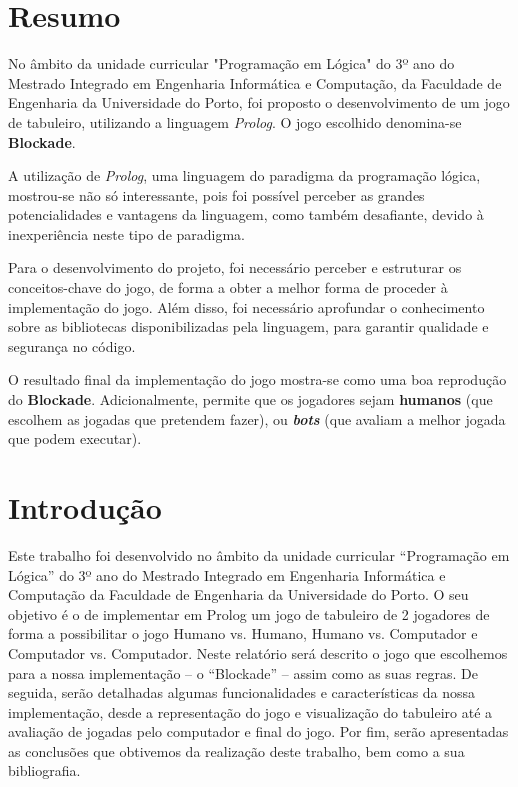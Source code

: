 \documentclass[a4paper]{article}
\begin{document}
\section*{Resumo}
No âmbito da unidade curricular "Programação em Lógica" do 3º ano do Mestrado Integrado em Engenharia Informática e Computação, da Faculdade de Engenharia da Universidade do Porto, foi proposto o desenvolvimento de um jogo de tabuleiro, utilizando a linguagem \textit{Prolog}. O jogo  escolhido denomina-se \textbf{Blockade}. \par
A utilização de \textit{Prolog}, uma linguagem do paradigma da programação lógica, mostrou-se não só interessante, pois foi possível perceber as grandes potencialidades e vantagens da linguagem, como também desafiante, devido à inexperiência neste tipo de paradigma. \par
Para o desenvolvimento do projeto, foi necessário perceber e estruturar os conceitos-chave do jogo, de forma a obter a melhor forma de proceder à implementação do jogo. Além disso, foi necessário aprofundar o conhecimento sobre as bibliotecas disponibilizadas pela linguagem, para garantir qualidade e segurança no código. \par
O resultado final da implementação do jogo mostra-se como uma boa reprodução do \textbf{Blockade}. Adicionalmente, permite que os jogadores sejam \mbox{\textbf{humanos}} (que escolhem as jogadas que pretendem fazer), ou \textbf{\textit{bots}} (que avaliam a melhor jogada que podem executar).

\newpage

\tableofcontents



\newpage

\section{Introdução}


Este trabalho foi desenvolvido no âmbito da unidade curricular “Programação em Lógica” do 3º ano do Mestrado Integrado em Engenharia Informática e Computação da Faculdade de Engenharia da Universidade do Porto. O seu objetivo é o de implementar em Prolog um jogo de tabuleiro de 2 jogadores de forma a possibilitar o jogo Humano vs. Humano, Humano vs. Computador e Computador vs. Computador.
Neste relatório será descrito o jogo que escolhemos para a nossa implementação – o “Blockade” – assim como as suas regras. De seguida, serão detalhadas algumas funcionalidades e características da nossa implementação, desde a representação do jogo e visualização do tabuleiro até a avaliação de jogadas pelo computador e final do jogo. Por fim, serão apresentadas as conclusões que obtivemos da realização deste trabalho, bem como a sua bibliografia.
\end{document}
